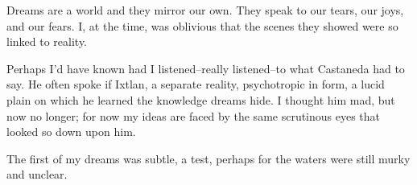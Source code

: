 \documentclass{article}
\begin{document}
\noindent
Dreams are a world and they mirror our own.
They speak to our tears, our joys, and our fears.
I, at the time, was oblivious that the scenes they
showed were so linked to reality.


Perhaps I'd have known had I listened--really listened--to
what Castaneda had to say.
He often spoke if Ixtlan,
a separate reality,
psychotropic in form,
a lucid plain on which he learned the knowledge dreams hide.
I thought him mad, but now no longer;
for now my ideas are faced by the same scrutinous eyes
that looked so down upon him.
\VV


\noindent
The first of my dreams was subtle, a test, perhaps
for the waters were still murky and unclear.
\end{document}
